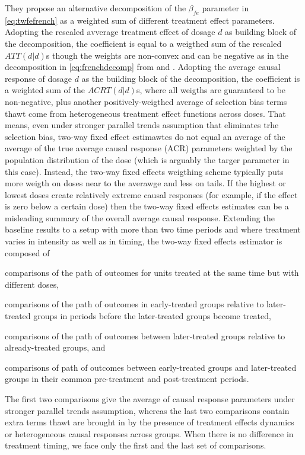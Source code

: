 \documentclass[11pt]{article}
\begin{document}
They propose an alternative decomposition of the $\beta_{fe}$ parameter in \eqref{eq:twfefrench} as a weighted sum of different treatment effect parameters. Adopting the rescaled avverage treatment effect of dosage $d$ as building block of the decomposition, the coefficient is equal to a weigthed sum of the rescaled $ATT(d|d)$s though the weights are non-convex and can be negative as in the decomposition in \eqref{eq:frenchdecomp} from \citet{bib:dechaisemartin2020} and \citet{bib:goodman-bacon2021}. Adopting the average causal response of dosage $d$ as the building block of the decomposition, the coefficient is a weighted sum of the $ACRT(d|d)$s, where all weigths are guaranteed to be non-negative, plus another positively-weigthed average of selection bias terms thawt come from heterogeneous treatment effect functions across doses. That means, even under stronger parallel trends assumption that eliminates trhe selection bias, two-way fixed effect estimawtes do not equal an average of the average of the true average causal response (ACR) parameters weighted by the population distribution of the dose (which is arguably the targer parameter in this case). Instead, the two-way fixed effects weigthing scheme typically puts more weigth on doses near to the averawge and less on tails. If the highest or lowest doses create relatively extreme causal responses (for example, if the effect is zero below a certain dose) then the two-way fixed effects estimates can be a misleading summary of the overall average causal response.
Extending the baseline results to a setup with more than two time periods and where treatment varies in intensity as well as in timing, the two-way fixed effects estimator is composed of
\begin{inlinelist}
    \item comparisons of the path of outcomes for units treated at the same time but with different doses,
    \item comparisons of the path of outcomes in early-treated groups relative to later-treated groups in periods before the later-treated groups become treated,
    \item comparisons of the path of outcomes between later-treated groups relative to already-treated groups, and
    \item comparisons of path of outcomes between early-treated groups and later-treated groups in their common pre-treatment and post-treatment periods.  
\end{inlinelist}
The first two comparisons give the average of causal response parameters under stronger parallel trends assumption, whereas the last two comparisons contain extra terms thawt are brought in by the presence of treatment effects dynamics or heterogeneous causal responses across groups. When there is no difference in treatment timing, we face only the first and the last set of comparisons.
\end{document}
